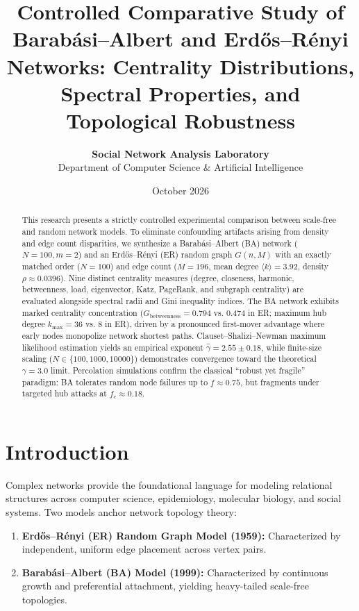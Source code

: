 \documentclass[11pt,a4paper]{article}
\title{\textbf{Controlled Comparative Study of Barab\'asi--Albert and Erd\H{o}s--R\'enyi Networks: Centrality Distributions, Spectral Properties, and Topological Robustness}}
\author{\textbf{Social Network Analysis Laboratory} \\ Department of Computer Science \& Artificial Intelligence}
\date{October 2026}
\begin{document}
\maketitle

\begin{abstract}
This research presents a strictly controlled experimental comparison between scale-free and random network models. To eliminate confounding artifacts arising from density and edge count disparities, we synthesize a Barab\'asi--Albert (BA) network ($N=100, m=2$) and an Erd\H{o}s--R\'enyi (ER) random graph $G(n, M)$ with an exactly matched order ($N=100$) and edge count ($M=196$, mean degree $\langle k \rangle = 3.92$, density $\rho \approx 0.0396$). Nine distinct centrality measures (degree, closeness, harmonic, betweenness, load, eigenvector, Katz, PageRank, and subgraph centrality) are evaluated alongside spectral radii and Gini inequality indices. The BA network exhibits marked centrality concentration ($G_{\text{betweenness}} = 0.794$ vs. $0.474$ in ER; maximum hub degree $k_{\max}=36$ vs. $8$ in ER), driven by a pronounced first-mover advantage where early nodes monopolize network shortest paths. Clauset--Shalizi--Newman maximum likelihood estimation yields an empirical exponent $\hat{\gamma} = 2.55 \pm 0.18$, while finite-size scaling ($N \in \{100, 1000, 10000\}$) demonstrates convergence toward the theoretical $\gamma = 3.0$ limit. Percolation simulations confirm the classical ``robust yet fragile'' paradigm: BA tolerates random node failures up to $f \approx 0.75$, but fragments under targeted hub attacks at $f_c \approx 0.18$.
\end{abstract}

\section{Introduction}
Complex networks provide the foundational language for modeling relational structures across computer science, epidemiology, molecular biology, and social systems. Two models anchor network topology theory:
\begin{enumerate}
    \item \textbf{Erd\H{o}s--R\'enyi (ER) Random Graph Model (1959):} Characterized by independent, uniform edge placement across vertex pairs.
    \item \textbf{Barab\'asi--Albert (BA) Model (1999):} Characterized by continuous growth and preferential attachment, yielding heavy-tailed scale-free topologies.
\end{enumerate}
\end{document}
